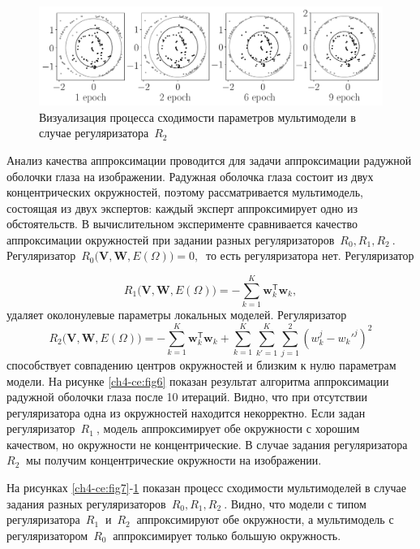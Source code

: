 \begin{figure}
\center
     \includegraphics[width=\textwidth]{results/priorexpertfig/experiment_real_regular}
     \caption{Визуализация процесса сходимости параметров мультимодели в случае регуляризатора~$ R_2~$}
    \label{ch4-ce:fig9}
\end{figure}

Анализ качества аппроксимации проводится для задачи аппроксимации радужной оболочки глаза на изображении. Радужная оболочка глаза состоит из двух концентрических окружностей, поэтому рассматривается мультимодель, состоящая из двух экспертов: каждый эксперт аппроксимирует одно из обстоятельств. В вычислительном эксперименте сравнивается качество аппроксимации окружностей при задании разных регуляризаторов~$ R_0, R_1, R_2~$. Регуляризатор~$ R_0 \bigl(\mathbf{V}, \mathbf{W}, E(\Omega) \bigr) = 0,~$ то есть регуляризатора нет. Регуляризатор

\[
R_1\bigl(\mathbf{V}, \mathbf{W}, E(\Omega)\bigr)= -\sum_{k=1}^{K}\mathbf{w}_k^{\mathsf{T}}\mathbf{w}_k,
\]
удаляет околонулевые параметры локальных моделей.
Регуляризатор
\[
R_2\bigl(\mathbf{V}, \mathbf{W}, E(\Omega)\bigr)= -\sum_{k=1}^{K}\mathbf{w}_k^{\mathsf{T}}\mathbf{w}_k + \sum_{k=1}^{K}\sum_{k'=1}^{K}\sum_{j=1}^2\left(w_k^j-w_k'^j\right)^2
\]
способствует совпадению центров окружностей и близким к нулю параметрам модели.
На рисунке \ref{ch4-ce:fig6} показан результат алгоритма аппроксимации радужной оболочки глаза после 10 итераций. Видно, что при отсутствии регуляризатора одна из окружностей находится некорректно. Если задан регуляризатор~$ R_1~$, модель аппроксимирует обе окружности с хорошим качеством, но окружности не концентрические. В случае задания регуляризатора~$ R_2~$ мы получим концентрические окружности на изображении.

На рисунках \ref{ch4-ce:fig7}-\ref{ch4-ce:fig9} показан процесс сходимости мультимоделей в случае задания разных регуляризаторов~$ R_0, R_1, R_2~$. Видно, что модели с типом регуляризатора~$ R_1~$ и~$ R_2~$ аппроксимируют обе окружности, а мультимодель с регуляризатором~$ R_0~$ аппроксимирует только большую окружность.
